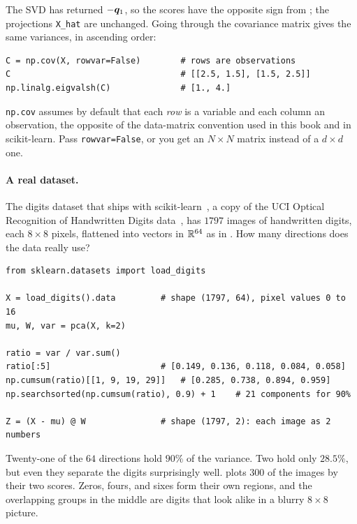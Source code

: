 The SVD has returned $-\bm{q}_1$, so the scores have the opposite sign
from ; the projections \texttt{X\_hat} are unchanged.
Going through the covariance matrix gives the same variances, in
ascending order:

\begin{lstlisting}
C = np.cov(X, rowvar=False)        # rows are observations
C                                  # [[2.5, 1.5], [1.5, 2.5]]
np.linalg.eigvalsh(C)              # [1., 4.]
\end{lstlisting}

\begin{note}
  \texttt{np.cov} assumes by default that each \emph{row} is a variable
  and each column an observation, the opposite of the data-matrix
  convention used in this book and in scikit-learn. Pass
  \texttt{rowvar=False}, or you get an $N \times N$ matrix instead of a
  $d \times d$ one.
\end{note}

\paragraph{A real dataset.}
The digits dataset that ships with scikit-learn~\cite{pedregosa2011sklearn},
a copy of the UCI Optical Recognition of Handwritten Digits
data~\cite{alpaydin1998digits}, has $1797$ images of
handwritten digits, each $8 \times 8$ pixels, flattened into vectors in
$\mathbb{R}^{64}$ as in . How many directions does the
data really use?

\begin{lstlisting}
from sklearn.datasets import load_digits

X = load_digits().data         # shape (1797, 64), pixel values 0 to 16
mu, W, var = pca(X, k=2)

ratio = var / var.sum()
ratio[:5]                      # [0.149, 0.136, 0.118, 0.084, 0.058]
np.cumsum(ratio)[[1, 9, 19, 29]]   # [0.285, 0.738, 0.894, 0.959]
np.searchsorted(np.cumsum(ratio), 0.9) + 1    # 21 components for 90%

Z = (X - mu) @ W               # shape (1797, 2): each image as 2 numbers
\end{lstlisting}

Twenty-one of the $64$ directions hold $90\%$ of the variance. Two hold
only $28.5\%$, but even they separate the digits surprisingly well.
 plots $300$ of the images by their two scores.
Zeros, fours, and sixes form their own regions, and the overlapping groups
in the middle are digits that look alike in a blurry $8 \times 8$
picture.

